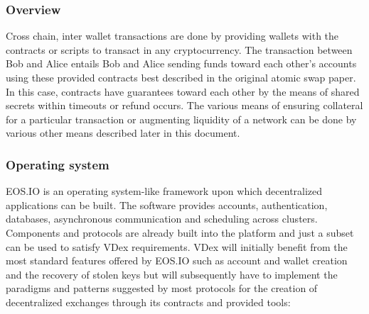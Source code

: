 \documentclass[]{article}
\begin{document}
	\subsubsection{Overview}
	Cross chain, inter wallet transactions are done by providing wallets with the contracts or scripts to transact in any cryptocurrency. 
	The transaction between Bob and Alice entails Bob and Alice sending funds toward each other's accounts 
	using these provided contracts best described in the original atomic swap paper.\cite{22} 
	In this case, contracts have guarantees toward each other by the means of shared secrets within timeouts or refund occurs. 
	The various means of ensuring collateral for a particular transaction or augmenting liquidity of a network 
	can be done by various other means described later in this document.
  
	\subsubsection{Operating system}
	EOS.IO is an operating system-like framework upon which decentralized applications can be built. 
	The software provides accounts, authentication, databases, asynchronous communication and scheduling across clusters. 
	Components and protocols are already built into the platform and just a subset can be used to satisfy VDex requirements. 
	VDex will initially benefit from the most standard features offered by EOS.IO such as account and wallet creation 
	and the recovery of stolen keys but will subsequently have to implement the paradigms and patterns suggested by most protocols 
	for the creation of decentralized exchanges through its contracts and provided tools:	\cite{3}\\
  
\end{document}
